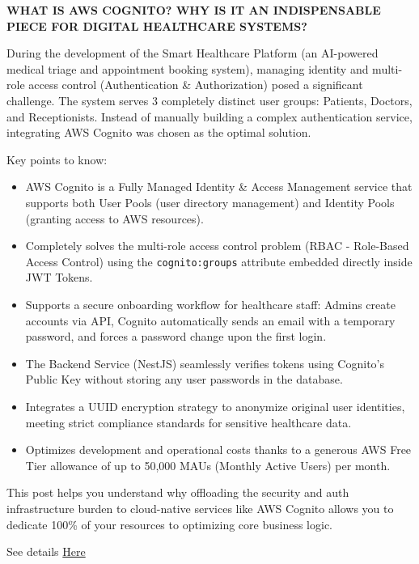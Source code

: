 \vspace{0.5em}\noindent\textbf{WHAT IS AWS COGNITO? WHY IS IT AN INDISPENSABLE PIECE FOR
DIGITAL HEALTHCARE SYSTEMS?}

During the development of the Smart Healthcare Platform (an AI-powered
medical triage and appointment booking system), managing identity and
multi-role access control (Authentication \& Authorization) posed a
significant challenge. The system serves 3 completely distinct user
groups: Patients, Doctors, and Receptionists. Instead of manually
building a complex authentication service, integrating AWS Cognito was
chosen as the optimal solution.

Key points to know:

\begin{itemize}
\tightlist
\item
  AWS Cognito is a Fully Managed Identity \& Access Management service
  that supports both User Pools (user directory management) and Identity
  Pools (granting access to AWS resources).
\item
  Completely solves the multi-role access control problem (RBAC -
  Role-Based Access Control) using the \texttt{cognito:groups} attribute
  embedded directly inside JWT Tokens.
\item
  Supports a secure onboarding workflow for healthcare staff: Admins
  create accounts via API, Cognito automatically sends an email with a
  temporary password, and forces a password change upon the first login.
\item
  The Backend Service (NestJS) seamlessly verifies tokens using
  Cognito's Public Key without storing any user passwords in the
  database.
\item
  Integrates a UUID encryption strategy to anonymize original user
  identities, meeting strict compliance standards for sensitive
  healthcare data.
\item
  Optimizes development and operational costs thanks to a generous AWS
  Free Tier allowance of up to 50,000 MAUs (Monthly Active Users) per
  month.
\end{itemize}

This post helps you understand why offloading the security and auth
infrastructure burden to cloud-native services like AWS Cognito allows
you to dedicate 100\% of your resources to optimizing core business
logic.

See details
\href{https://www.facebook.com/groups/awsstudygroupfcj/permalink/2228021697962790/?rdid=MLFJXbxXfs8sMMKH\#}{Here}
